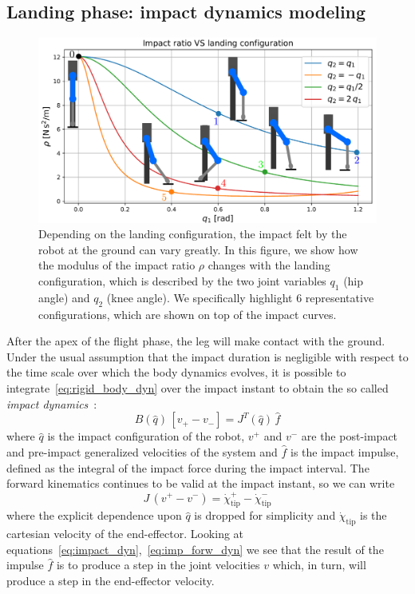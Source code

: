 \subsection{Landing phase: impact dynamics modeling}\label{subsec:impact_min}
\begin{figure}[t]
    \centering
    \includegraphics[width=1\columnwidth]{images/impact_ratio.pdf}
    \caption{Depending on the landing configuration, the impact felt by the robot at the ground can vary greatly. In this figure, we show how the modulus of the impact ratio $\rho$ changes with the landing configuration, which is described by the two joint variables $q_1$ (hip angle) and $q_2$ (knee angle). We specifically highlight 6 representative configurations, which are shown on top of the impact curves.}
    \label{fig:impact_ratio}
\end{figure}
After the apex of the flight phase, the leg will make contact with the ground. Under the usual assumption that the impact duration is negligible with respect to the time scale over which the body dynamics evolves, it is possible to integrate~\eqref{eq:rigid_body_dyn} over the impact instant to obtain the so called \textit{impact dynamics}~\cite{impact_dyn::walker1990use}:
\begin{equation}
    \label{eq:impact_dyn}
B(\hat{q})\,\left[v_{+} - v_{-}\right] = J^{T}(\hat{q})\,\hat{f}
\end{equation}
where $\hat{q}$ is the impact configuration of the robot, $v^{+}$ and $v^{-}$ are the post-impact and pre-impact generalized velocities of the system and $\hat{f}$ is the impact impulse, defined as the integral of the impact force during the impact interval.
The forward kinematics continues to be valid at the impact instant, so we can write
\begin{equation}\label{eq:imp_forw_dyn}
    J\,\left( v^{+} - v^{-} \right) = \dot{\chi}_{\mathrm{tip}}^{+} - \dot{\chi}_{\mathrm{tip}}^{-}
\end{equation}
where the explicit dependence upon $\hat{q}$ is dropped for simplicity and $\dot{\chi}_{\mathrm{tip}}$ is the cartesian velocity of the end-effector. 
Looking at equations~\eqref{eq:impact_dyn},~\eqref{eq:imp_forw_dyn} we see that the result of the impulse $\hat{f}$ is to produce a step in the joint velocities $v$ which, in turn, will produce a step in the end-effector velocity. 

